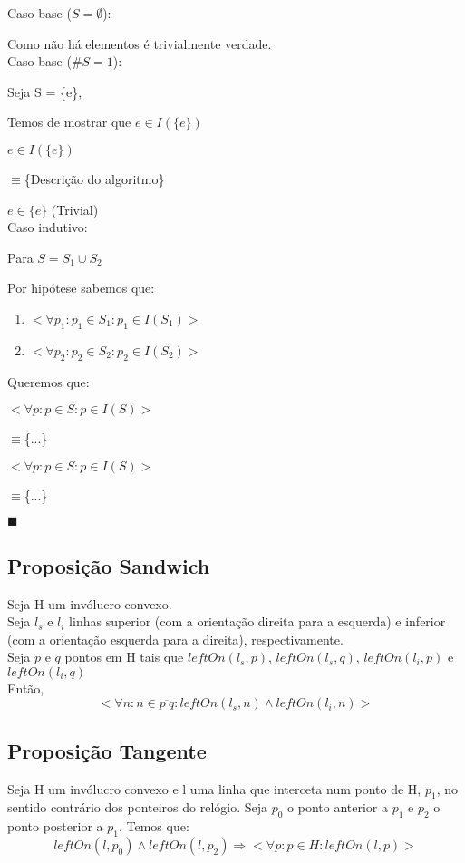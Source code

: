 \documentclass[11pt]{article}
\begin{document}
Caso base ($S = \emptyset$):\par
    Como não há elementos é trivialmente verdade.\\
Caso base ($\#S = 1$):\par
    Seja S = \{e\},\par
    Temos de mostrar que $e \in I(\{e\})$\par
    $e \in I(\{e\})$\par
    $\equiv$\{Descrição do algoritmo\}\par
    $e \in \{e\}$ (Trivial)\\
Caso indutivo:\par
    Para $S = S_1 \cup S_2$\par
    Por hipótese sabemos que:\par
    \begin{enumerate}
        \item 
            $<\forall p_1 : p_1 \in S_1 : 
                p_1 \in I(S_1)
            >$
        \item 
            $<\forall p_2 : p_2 \in S_2 : 
                p_2 \in I(S_2)
            >$
    \end{enumerate}\par
    Queremos que:\par
    $<\forall p : p \in S : 
        p \in I(S)
    >$\par
    $\equiv$\{...\}\par
    $<\forall p : p \in S : 
        p \in I(S)
    >$\par
    $\equiv$\{...\}\par

\hfill $\blacksquare$

\subsection{Proposição Sandwich}
Seja H um invólucro convexo.\\
Seja $l_s$ e $l_i$ linhas superior (com a orientação direita para a esquerda) e 
inferior (com a orientação esquerda para a direita), respectivamente.\\
Seja $p$ e $q$ pontos em H tais que $leftOn(l_s, p)$, $leftOn(l_s, q)$, $leftOn(l_i, p)$ e $leftOn(l_i, q)$\\
Então,
        $$<\forall n : n \in \overline{p\ q} : leftOn(l_s, n) \wedge leftOn(l_i, n)>$$

\subsection{Proposição Tangente}
Seja 
    H um invólucro convexo e 
    l uma linha que interceta num ponto de H, $p_1$,
no sentido contrário dos ponteiros do relógio.
Seja $p_0$ o ponto anterior a $p_1$ e $p_2$ o ponto posterior a $p_1$.
Temos que:
$$leftOn(l, p_0) \wedge leftOn(l, p_2) \Rightarrow
    <\forall p : p \in H : leftOn(l, p)>$$
\end{document}
